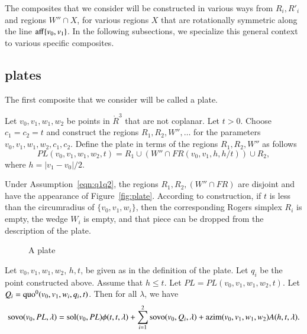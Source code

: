 The composites that we consider will be constructed in various
ways from $R_i,R'_i$ and regions $W''\cap X$, for various regions
$X$ that are rotationally symmetric along the line ${\operatorname{aff}}\{v_0,v_1\}$.
In the following subsections, we specialize this general
context to various specific composites.

\subsection{plates}

The first composite that we consider will be called a plate.

\begin{definition}
Let $v_0,v_1,w_1,w_2$ be points in $\ring{R}^3$ that are not
coplanar.  Let $t > 0$.  Choose $c_1=c_2=t$ and construct
the regions $R_1,R_2,W'',\ldots$ for the parameters 
$v_0,v_1,w_1,w_2,c_1,c_2$.
Define the plate in terms of the regions $R_1,R_2,W''$ as follows
  $$
  PL(v_0,v_1,w_1,w_2,t) = 
  R_1 \cup (W''\cap FR(v_0,v_1,h,h/t))\cup R_2,
  $$
where $h = |v_1-v_0|/2$.
\end{definition}

Under Assumption~\ref{eqn:q1q2}, the regions $R_1,R_2,(W''\cap FR)$
are disjoint and have the appearance of Figure~\ref{fig:plate}.
According to construction, if $t$ is less than the circumradius
of $\{v_0,v_1,w_i\}$, then the corresponding Rogers simplex $R_i$
is empty, the wedge $W_i$ is empty, and that piece can be dropped
from the description of the plate.

\begin{figure}[htb]
  \centering
  \caption{A plate}
\end{figure}


\begin{lemma}
Let $v_0,v_1,w_1,w_2$, $h,t$, be given as in the definition of
the plate. Let $q_i$ be the point constructed above. 
Assume that $h\le t$.  
Let $PL=PL(v_0,v_1,w_1,w_2,t)$.
Let $Q_i=\operatorname{quo}^0(v_0,v_1,w_i,q_i,t)$.
Then for all $\lambda$, we have
  $$
  {\operatorname{sovo}}(v_0,PL,\lambda) = 
  \operatorname{sol}(v_0,PL)\phi(t,t,\lambda) + 
  \sum_{i=1}^2{\operatorname{sovo}}(v_0,Q_i,\lambda) +
  {\operatorname{azim}}(v_0,v_1,w_1,w_2) A(h,t,\lambda).
  $$
\end{lemma}


